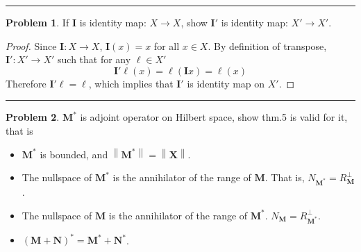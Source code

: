 \documentclass[a4paper, 10pt]{article}
\theoremstyle{definition}
\newtheorem{problem}{Problem}
\theoremstyle{hSol}
\begin{document}
\noindent\rule{16cm}{0.4pt}
\begin{problem} If $\bm{I}$ is identity map: $X\to X$, show $\bm{I}'$ is identity map: $X' \to X'$.
\end{problem}
\begin{proof} Since $\bm{I}: X \to X$, $\bm{I}(x)=x$ for all $x\in X$. By definition of transpose, $\bm{I}':X'\to X'$ such that for any $\ell \in X'$
\begin{equation}
	\bm{I}'\ell(x) = \ell(\bm{I}x) = \ell(x)
\end{equation}
Therefore $\bm{I}'\ell = \ell$, which implies that $\bm{I}'$ is identity map on $X'$.
\end{proof}

\noindent\rule{16cm}{0.4pt}
\begin{problem} $\bm{M}^*$ is adjoint operator on Hilbert space, show thm.5 is valid for it, that is
\begin{itemize}
		\item[1.] $\bm{M}^*$ is bounded, and $\left\|\bm{M}^*\right\|=\left\|\bm{X}\right\|$.
		\item[2.] The nullspace of $\bm{M}^*$ is the annihilator of the range of $\bm{M}$. That is, $N_{\bm{M}^*}=R^{\bot}_{\bm{M}}$.
		\item[3.] The nullspace of $\bm{M}$ is the annihilator of the range of $\bm{M}^*$. $N_{\bm{M}} = R^{\bot}_{\bm{M}^*}$.
		\item[4.] $(\bm{M}+\bm{N})^* = \bm{M}^* + \bm{N}^*$.
\end{itemize}	
\end{problem}
\end{document}
